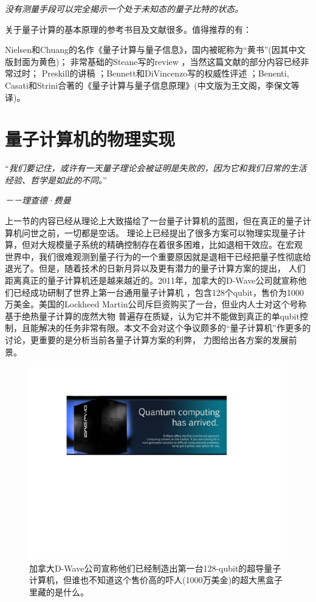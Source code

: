 \emph{没有测量手段可以完全揭示一个处于未知态的量子比特的状态。}

关于量子计算的基本原理的参考书目及文献很多。值得推荐的有：

Nielsen和Chuang的名作《量子计算与量子信息》\cite{yellow}，国内被昵称为“黄书”(因其中文版封面为黄色)；
非常基础的Steane写的review \cite{steane}，当然这篇文献的部分内容已经非常过时；
Preskill的讲稿 \cite{Preskill}；Bennett和DiVincenzo写的权威性评述 \cite{benben}；Benenti, Casati和Strini合著的《量子计算与量子信息原理》\cite{wangwenge}(中文版为王文阁，李保文等译)。

\section{量子计算机的物理实现}

    “\emph{我们要记住，或许有一天量子理论会被证明是失败的，因为它和我们日常的生活经验、哲学是如此的不同。}”

 \hspace{23em} \emph{－－理查德·费曼}

上一节的内容已经从理论上大致描绘了一台量子计算机的蓝图，但在真正的量子计算机问世之前，一切都是空话。
理论上已经提出了很多方案可以物理实现量子计算，但对大规模量子系统的精确控制存在着很多困难，比如退相干效应。在宏观
世界中，我们很难观测到量子行为的一个重要原因就是退相干已经把量子性彻底给退光了。但是，随着技术的日新月异以及更有潜力的量子计算方案的提出，
人们距离真正的量子计算机还是越来越近的。2011年，加拿大的D-Wave公司就宣称他们已经成功研制了世界上第一台通用量子计算机 \cite{dwave}，包含128个qubit，售价为1000
万美金。美国的Lockheed Martin公司斥巨资购买了一台，但业内人士对这个号称基于绝热量子计算的庞然大物 普遍存在质疑，认为它并不能做到真正的单qubit控制，且能解决的任务非常有限。本文不会对这个争议颇多的“量子计算机”作更多的讨论，更重要的是分析当前各量子计算方案的利弊，
力图给出各方案的发展前景。

 \begin{figure}[htbp]
            \begin{center}
              \includegraphics[width= 0.8\columnwidth]{figures/dwaveqc.pdf}
              \caption{加拿大D-Wave公司宣称他们已经制造出第一台128-qubit的超导量子计算机，但谁也不知道这个售价高的吓人(1000万美金)的超大黑盒子里藏的是什么。
              }
              \label{dwave}
            \end{center}
  \end{figure}

